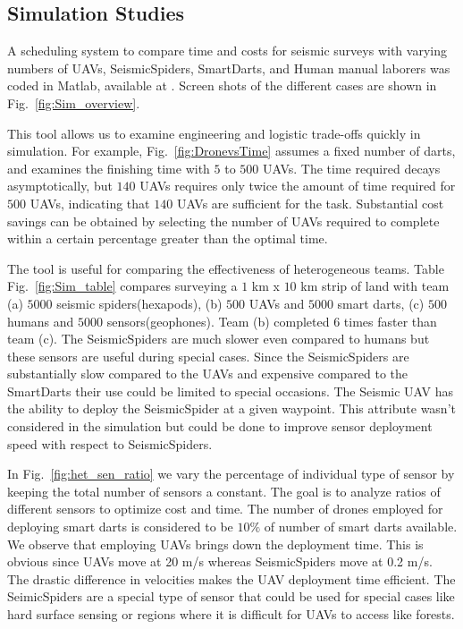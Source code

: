 \subsection{Simulation Studies}

A scheduling system to compare  time and costs for seismic surveys with varying numbers of UAVs, SeismicSpiders, SmartDarts, and Human manual laborers was coded in  {\sc Matlab}, available at \cite{Srikanth2016seismicScheduler}. Screen shots of the different cases are shown in Fig.~\ref{fig:Sim_overview}.

This tool allows us to examine engineering and logistic trade-offs quickly in simulation.  For example, Fig.~\ref{fig:DronevsTime} assumes a fixed number of darts, and examines the finishing time with $5$ to $500$ UAVs.  The time required decays asymptotically, but $140$ UAVs requires only twice the amount of time required for $500$ UAVs, indicating that $140$ UAVs are sufficient for the task.%
Substantial cost savings can be obtained by selecting the number of UAVs required to complete within a certain percentage greater than the optimal time.

The tool is useful for comparing the effectiveness of heterogeneous teams.  Table Fig.~\ref{fig:Sim_table} compares surveying a $1$ km x $10$ km strip of land with team (a) $5000$ seismic spiders(hexapods), (b) $500$ UAVs and $5000$ smart darts, (c) $500$ humans and $5000$ sensors(geophones).  Team (b) completed $6$ times faster than team (c). The SeismicSpiders are much slower even compared to humans but these sensors are useful during special cases. Since the SeismicSpiders are substantially slow compared to the UAVs and expensive compared to the SmartDarts their use could be limited to special occasions. The Seismic UAV has the ability to deploy the SeismicSpider at a given waypoint. This attribute wasn't considered in the simulation but could be done to improve sensor deployment speed with respect to SeismicSpiders.
   
In Fig.~\ref{fig:het_sen_ratio} we vary the percentage of individual type of sensor by keeping the total number of sensors a constant. The goal is to analyze ratios of different sensors to optimize cost and time. The number of drones employed for deploying smart darts is considered to be $10\%$ of number of smart darts available. We observe that employing UAVs brings down the deployment time. This is obvious since UAVs move at 20 m/s whereas SeismicSpiders move at 0.2 m/s. The drastic difference in velocities makes the UAV deployment time efficient. The SeimicSpiders are a special type of sensor that could be used for special cases like hard surface sensing or regions where it is difficult for UAVs to access like forests.

